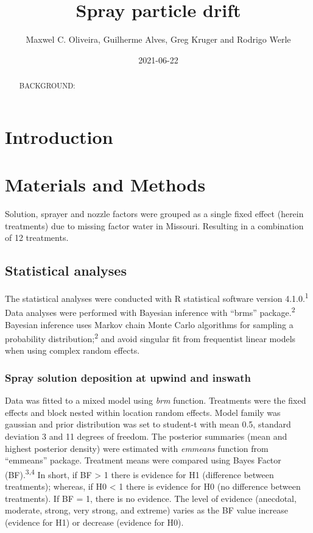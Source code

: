 \documentclass[
  12pt,
  a4paper,
]{article}
\title{Spray particle drift}
\author{Maxwel C. Oliveira, Guilherme Alves, Greg Kruger and Rodrigo
Werle}
\date{2021-06-22}
\begin{document}
\maketitle
\begin{abstract}
BACKGROUND:
\end{abstract}

\hypertarget{introduction}{%
\section{Introduction}\label{introduction}}

\hypertarget{materials-and-methods}{%
\section{Materials and Methods}\label{materials-and-methods}}

Solution, sprayer and nozzle factors were grouped as a single fixed
effect (herein treatments) due to missing factor water in Missouri.
Resulting in a combination of 12 treatments.

\hypertarget{statistical-analyses}{%
\subsection{Statistical analyses}\label{statistical-analyses}}

The statistical analyses were conducted with R statistical software
version 4.1.0.\textsuperscript{1} Data analyses were performed with
Bayesian inference with ``brms'' package.\textsuperscript{2} Bayesian
inference uses Markov chain Monte Carlo algorithms for sampling a
probability distribution;\textsuperscript{2} and avoid singular fit from
frequentist linear models when using complex random effects.

\hypertarget{spray-solution-deposition-at-upwind-and-inswath}{%
\subsubsection{Spray solution deposition at upwind and
inswath}\label{spray-solution-deposition-at-upwind-and-inswath}}

Data was fitted to a mixed model using \emph{brm} function. Treatments
were the fixed effects and block nested within location random effects.
Model family was gaussian and prior distribution was set to student-t
with mean 0.5, standard deviation 3 and 11 degrees of freedom. The
posterior summaries (mean and highest posterior density) were estimated
with \emph{emmeans} function from ``emmeans'' package. Treatment means
were compared using Bayes Factor (BF).\textsuperscript{3,4} In short, if
BF \textgreater{} 1 there is evidence for H1 (difference between
treatments); whereas, if H0 \textless{} 1 there is evidence for H0 (no
difference between treatments). If BF = 1, there is no evidence. The
level of evidence (anecdotal, moderate, strong, very strong, and
extreme) varies as the BF value increase (evidence for H1) or decrease
(evidence for H0).
\end{document}
